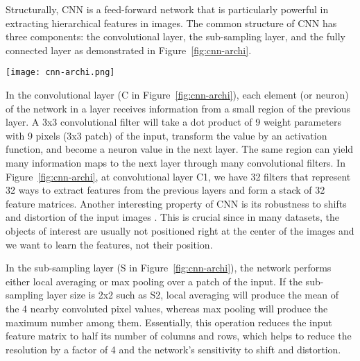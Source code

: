 \documentclass[journal, 12pt, onecolumn,draftclsnofoot]{IEEEtran}
\begin{document}
Structurally, CNN is a feed-forward network that is particularly powerful in extracting hierarchical features in images. The common structure of CNN has three components: the convolutional layer, the sub-sampling layer, and the fully connected layer as demonstrated in Figure~\ref{fig:cnn-archi}. 

\begin{figure*}[h]{\centering
\texttt{[image: cnn-archi.png]} \\
\centering\caption{A sample structure of convolutional neural networks, inspired by LeNet-5 architecture in \cite{cnn} ; C: Convolutional layer, S: Sub-sampling layer, F: Fully connected layer; 32@(148x148) means there are 32 filters to extract the features from the input image, and the original input size of 150x150 is reduced to 148x148 since no padding is added around the edges during $3\times3$ convolution operations so 2 edge rows and 2 edge columns are lost; 2x2 Max-pooling means the data will be reduced by a factor of 4 after each operation; Output layer has 1 neuron since the network outputs the probability of one class (`Flooded/Damaged Building'), and the other probability is just 1-$\mathbb{P}$r(`Flooded/Damaged Building').}
\label{fig:cnn-archi}
}
\end{figure*}

In the convolutional layer (C in Figure~\ref{fig:cnn-archi}), each element (or neuron) of the network in a layer receives information from a small region of the previous layer. A 3x3 convolutional filter will take a dot product of 9 weight parameters with 9 pixels (3x3 patch) of the input, transform the value by an activation function, and become a neuron value in the next layer. The same region can yield many information maps to the next layer through many convolutional filters. In Figure~\ref{fig:cnn-archi}, at convolutional layer C1, we have 32 filters that represent 32 ways to extract features from the previous layers and form a stack of 32 feature matrices. Another interesting property of CNN is its robustness to shifts and distortion of the input images \cite{shift-invariant}. This is crucial since in many datasets, the objects of interest are usually not positioned right at the center of the images and we want to learn the features, not their position. 

In the sub-sampling layer (S in Figure~\ref{fig:cnn-archi}), the network performs either local averaging or max pooling over a patch of the input. If the sub-sampling layer size is 2x2 such as S2, local averaging will produce the mean of the 4 nearby convoluted pixel values, whereas max pooling will produce the maximum number among them. Essentially, this operation reduces the input feature matrix to half its number of columns and rows, which helps to reduce the resolution by a factor of 4 and the network's sensitivity to shift and distortion. 
\end{document}
